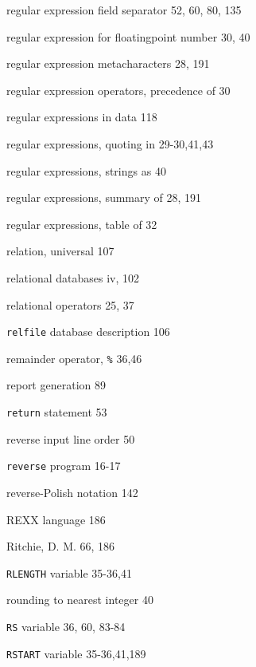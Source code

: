 \begin{multicols}{3}
\hangindent=3pc  regular expression field separator 52, 60, 80, 135

\hangindent=3pc  regular expression for floatingpoint number 30, 40



\hangindent=3pc  regular expression metacharacters 28, 191

\hangindent=3pc  regular expression operators, precedence of 30

\hangindent=3pc  regular expressions in data 118

\hangindent=3pc  regular expressions, quoting in 29-30,41,43

\hangindent=3pc  regular expressions, strings as 40

\hangindent=3pc  regular expressions, summary of 28, 191

\hangindent=3pc  regular expressions, table of 32

\hangindent=3pc  relation, universal 107

\hangindent=3pc  relational databases iv, 102

\hangindent=3pc  relational operators 25, 37

\hangindent=3pc  \verb'relfile' database description 106

\hangindent=3pc  remainder operator, \verb'%' 36,46

\hangindent=3pc  report generation 89

\hangindent=3pc  \verb'return' statement 53

\hangindent=3pc  reverse input line order 50

\hangindent=3pc  \verb'reverse' program 16-17

\hangindent=3pc  reverse-Polish notation 142

\hangindent=3pc  REXX language 186

\hangindent=3pc  Ritchie, D. M. 66, 186

\hangindent=3pc  \verb'RLENGTH' variable 35-36,41

\hangindent=3pc  rounding to nearest integer 40

\hangindent=3pc  \verb'RS' variable 36, 60, 83-84

\hangindent=3pc  \verb'RSTART' variable 35-36,41,189


\end{multicols}

